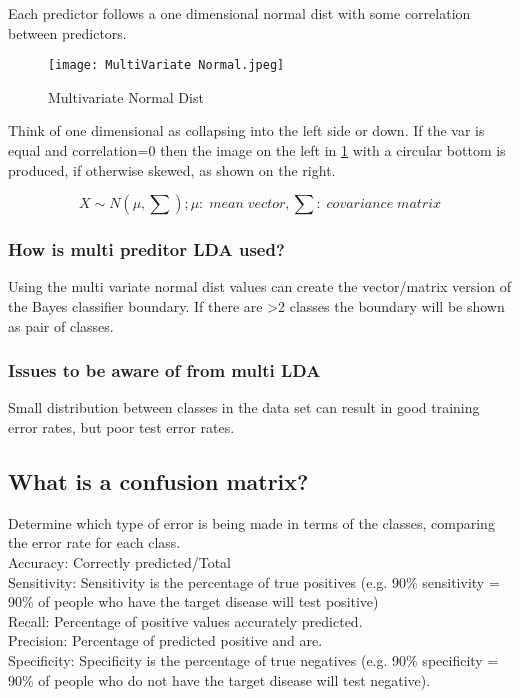 \documentclass[11pt]{scrartcl} %
\begin{document}
Each predictor follows a one dimensional normal dist with some correlation between predictors.

\begin{figure}[h] %
	\centering
	\texttt{[image: MultiVariate Normal.jpeg]} %
	\caption{Multivariate Normal Dist}
	\label{multi-normal}
\end{figure}

Think of one dimensional as collapsing into the left side or down. If the var is equal and correlation=0
then the image on the left in \ref{multi-normal} with a circular bottom is produced, if otherwise skewed,
as shown on the right.

\begin{equation}
	X \sim N(\mu,\sum); \mu:\; mean\; vector, \sum:\; covariance\; matrix
\end{equation}

\subsubsection{How is multi preditor LDA used?}

Using the multi variate normal dist values can create the vector/matrix version of the Bayes 
classifier boundary. If there are >2 classes the boundary will be shown as pair of classes.

\subsubsection{Issues to be aware of from multi LDA}

Small distribution between classes in the data set can result in good training error rates, but 
poor test error rates.

\subsection{What is a confusion matrix?}

Determine which type of error is being made in terms of the classes, comparing the error rate for
each class.\\

Accuracy: Correctly predicted/Total \\
Sensitivity: Sensitivity is the percentage of true positives (e.g. 90\% sensitivity = 90\% of people who have the target disease will test positive)\\
Recall: Percentage of positive values accurately predicted.\\
Precision: Percentage of predicted positive and are.\\
Specificity: Specificity is the percentage of true negatives (e.g. 90\% specificity = 90\% of people who do not have the target disease will test negative).\\
\end{document}

